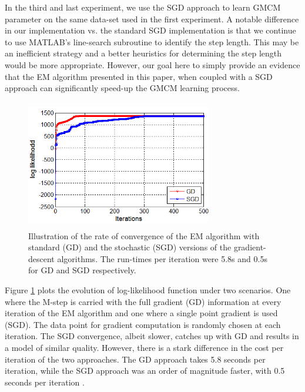 \documentclass[]{article}
\begin{document}
In the third and last experiment, we use the SGD approach to learn GMCM parameter on the same data-set used in the first experiment. A notable difference in our implementation  vs. the standard SGD implementation is that we continue to use MATLAB's line-search subroutine to identify the step length. This may be an inefficient strategy and a better heuristics for determining the step length would be more appropriate. However, our goal here to simply provide an evidence that the EM algorithm presented in this paper, when coupled with a SGD approach can significantly speed-up the GMCM learning process.  
\begin{figure}[h]
\includegraphics[width= 230pt,height=160pt]{sgd_vs_fgd}
\caption{Illustration of the rate of convergence of the EM algorithm with standard (GD) and the stochastic (SGD) versions of the gradient-descent algorithms. The run-times per iteration were 5.8s and 0.5s for GD and SGD respectively.}
\label{fig:sgd_vs_fgd}
\end{figure}
Figure \ref{fig:sgd_vs_fgd} plots the evolution of log-likelihood function under two scenarios. One where the M-step is carried with the full gradient (GD) information at every iteration of the EM algorithm and one where a single point gradient is used (SGD). The data point for gradient computation is randomly chosen at each iteration. The SGD convergence, albeit slower, catches up with GD and results in a model of similar quality. However, there is a stark difference in the cost per iteration of the two approaches. The GD approach takes 5.8 seconds per iteration, while the SGD approach was an order of magnitude faster, with 0.5 seconds per iteration . 
\end{document}
